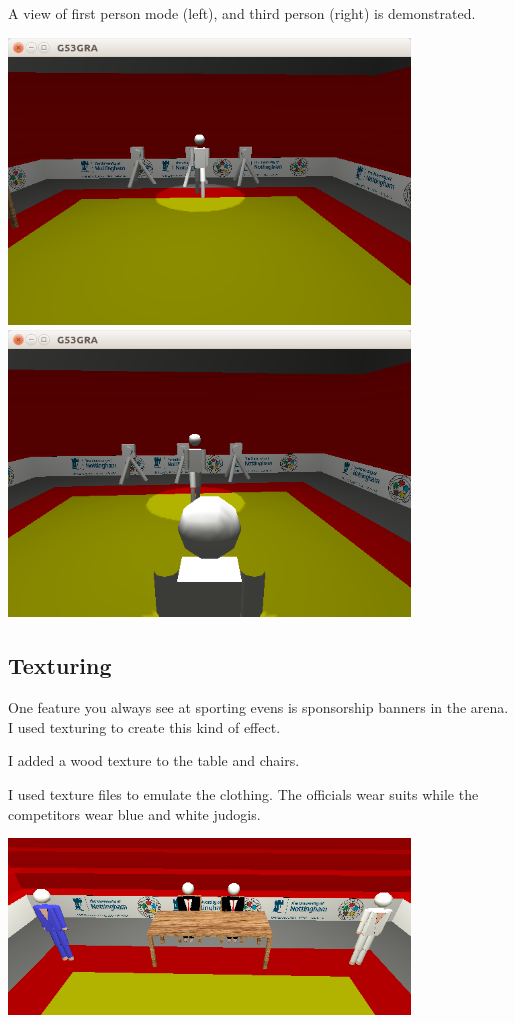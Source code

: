 \documentclass[12pt]{article}
\begin{document}
A view of first person mode (left), and third person (right) is demonstrated.


\begin{center}
	\includegraphics[width=0.8\textwidth]{FirstPerson.png} \includegraphics[width=0.8\textwidth]{ThirdPerson.png}
\end{center}


\subsection{Texturing}
 One feature you always see at sporting evens is sponsorship banners in the arena. I used texturing to create this kind of effect. 
 
 I added a wood texture to the table and chairs.
 
 I used texture files to emulate the clothing. The officials wear suits while the competitors wear blue and white judogis. 
\begin{center}
 \includegraphics[width=0.8\textwidth]{Texturing.png}
\end{center}
\end{document}
